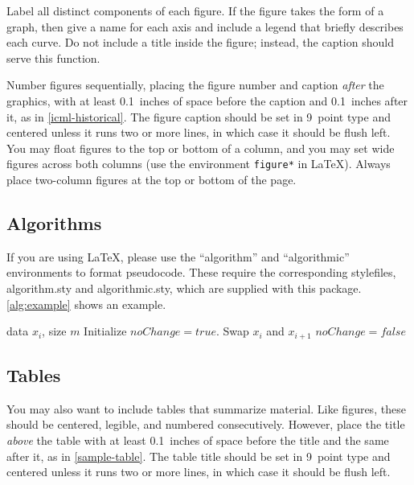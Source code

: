 \documentclass{article}
\theoremstyle{plain}
\theoremstyle{definition}
\theoremstyle{remark}
\begin{document}
Label all distinct components of each figure. If the figure takes the
form of a graph, then give a name for each axis and include a legend
that briefly describes each curve. Do not include a title inside the
figure; instead, the caption should serve this function.

Number figures sequentially, placing the figure number and caption
\emph{after} the graphics, with at least 0.1~inches of space before
the caption and 0.1~inches after it, as in
\cref{icml-historical}. The figure caption should be set in
9~point type and centered unless it runs two or more lines, in which
case it should be flush left. You may float figures to the top or
bottom of a column, and you may set wide figures across both columns
(use the environment \texttt{figure*} in \LaTeX). Always place
two-column figures at the top or bottom of the page.

\subsection{Algorithms}

If you are using \LaTeX, please use the ``algorithm'' and ``algorithmic''
environments to format pseudocode. These require
the corresponding stylefiles, algorithm.sty and
algorithmic.sty, which are supplied with this package.
\cref{alg:example} shows an example.

\begin{algorithm}[tb]
   \caption{Bubble Sort}
   \label{alg:example}
\begin{algorithmic}
    data $x_i$, size $m$
   \REPEAT
   \STATE Initialize $noChange = true$.
   \STATE Swap $x_i$ and $x_{i+1}$
   \STATE $noChange = false$
   \ENDIF
   \ENDFOR
\end{algorithmic}
\end{algorithm}

\subsection{Tables}

You may also want to include tables that summarize material. Like
figures, these should be centered, legible, and numbered consecutively.
However, place the title \emph{above} the table with at least
0.1~inches of space before the title and the same after it, as in
\cref{sample-table}. The table title should be set in 9~point
type and centered unless it runs two or more lines, in which case it
should be flush left.
\end{document}
